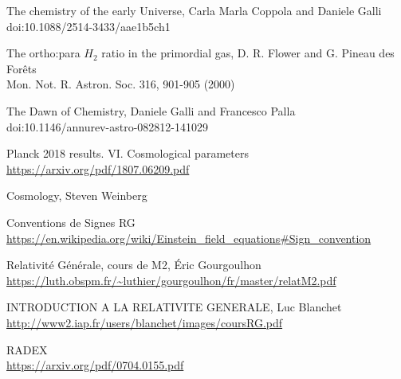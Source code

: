 \documentclass[10pt, a4paper]{report}
\numberwithin{equation}{subsection}
\begin{document}

\begin{thebibliography}{}

The chemistry of the early Universe, Carla Marla Coppola and Daniele Galli
\\doi:10.1088/2514-3433/aae1b5ch1

The ortho:para $H_2$ ratio in the primordial gas, D. R. Flower and G. Pineau des Forêts
\\Mon. Not. R. Astron. Soc. 316, 901-905 (2000)

The Dawn of Chemistry, Daniele Galli and Francesco Palla
\\doi:10.1146/annurev-astro-082812-141029

Planck 2018 results. VI. Cosmological parameters
\\\url{https://arxiv.org/pdf/1807.06209.pdf}

Cosmology, Steven Weinberg

Conventions de Signes RG
\\\url{https://en.wikipedia.org/wiki/Einstein_field_equations#Sign_convention}

Relativité Générale, cours de M2, Éric Gourgoulhon
\\\url{https://luth.obspm.fr/~luthier/gourgoulhon/fr/master/relatM2.pdf}

INTRODUCTION A LA RELATIVITE GENERALE, Luc Blanchet
\\\url{http://www2.iap.fr/users/blanchet/images/coursRG.pdf}

RADEX
\\\url{https://arxiv.org/pdf/0704.0155.pdf}



\end{thebibliography}
\end{document}
